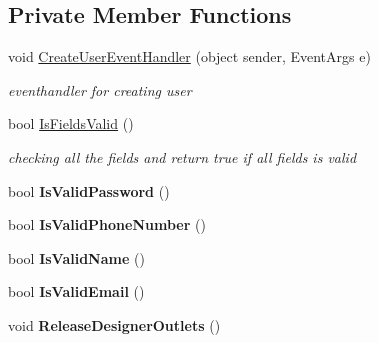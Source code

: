 \subsection*{Private Member Functions}
\begin{DoxyCompactItemize}
\item 
void \hyperlink{class_ramboell_1_1i_o_s_1_1_create_user_view_controller_aead6b702a9f1f9e55ece583ff3483b9b}{Create\+User\+Event\+Handler} (object sender, Event\+Args e)
\begin{DoxyCompactList}\small\item\em eventhandler for creating user \end{DoxyCompactList}\item 
bool \hyperlink{class_ramboell_1_1i_o_s_1_1_create_user_view_controller_a9fb584a81661ab13e7ebbbc4b22fa43e}{Is\+Fields\+Valid} ()
\begin{DoxyCompactList}\small\item\em checking all the fields and return true if all fields is valid \end{DoxyCompactList}\item 
\mbox{\label{class_ramboell_1_1i_o_s_1_1_create_user_view_controller_a317caa2b09455dc7d7e18cb59c69fea9}} 
bool {\bfseries Is\+Valid\+Password} ()
\item 
\mbox{\label{class_ramboell_1_1i_o_s_1_1_create_user_view_controller_a8449a20d5ee09c0166090ac86f299d9f}} 
bool {\bfseries Is\+Valid\+Phone\+Number} ()
\item 
\mbox{\label{class_ramboell_1_1i_o_s_1_1_create_user_view_controller_a77d72614f0c444b0f60620196f8306d8}} 
bool {\bfseries Is\+Valid\+Name} ()
\item 
\mbox{\label{class_ramboell_1_1i_o_s_1_1_create_user_view_controller_af1e5e0486e38b9969b31174bb1cb85d6}} 
bool {\bfseries Is\+Valid\+Email} ()
\item 
\mbox{\label{class_ramboell_1_1i_o_s_1_1_create_user_view_controller_a032e8df0f82d8ed39b11cbf867b96249}} 
void {\bfseries Release\+Designer\+Outlets} ()
\end{DoxyCompactItemize}

